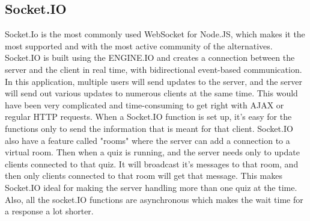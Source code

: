 \subsection{Socket.IO}
Socket.Io is the most commonly used WebSocket for Node.JS, which makes it the most supported and with the most active community of the alternatives. Socket.IO is built using the ENGINE.IO and creates a connection between the server and the client in real time, with bidirectional event-based communication. In this application, multiple users will send updates to the server, and the server will send out various updates to numerous clients at the same time. This would have been very complicated and time-consuming to get right with AJAX or regular HTTP requests. When a Socket.IO function is set up, it's easy for the functions only to send the information that is meant for that client. Socket.IO also have a feature called "rooms" where the server can add a connection to a virtual room. Then when a quiz is running, and the server needs only to update clients connected to that quiz. It will broadcast it's messages to that room, and then only clients connected to that room will get that message. This makes Socket.IO ideal for making the server handling more than one quiz at the time. Also, all the socket.IO functions are asynchronous which makes the wait time for a response a lot shorter.